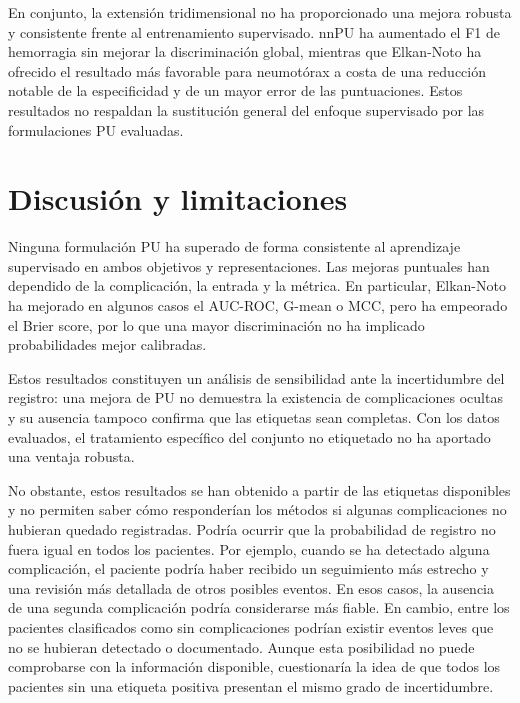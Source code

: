 En conjunto, la extensión tridimensional no ha proporcionado una mejora robusta y consistente frente al entrenamiento supervisado. nnPU ha aumentado el F1 de hemorragia sin mejorar la discriminación global, mientras que Elkan-Noto ha ofrecido el resultado más favorable para neumotórax a costa de una reducción notable de la especificidad y de un mayor error de las puntuaciones. Estos resultados no respaldan la sustitución general del enfoque supervisado por las formulaciones PU evaluadas.

\section{Discusión y limitaciones}

Ninguna formulación PU ha superado de forma consistente al aprendizaje supervisado en ambos objetivos y representaciones. Las mejoras puntuales han dependido de la complicación, la entrada y la métrica. En particular, Elkan-Noto ha mejorado en algunos casos el AUC-ROC, G-mean o MCC, pero ha empeorado el Brier score, por lo que una mayor discriminación no ha implicado probabilidades mejor calibradas.

Estos resultados constituyen un análisis de sensibilidad ante la incertidumbre del registro: una mejora de PU no demuestra la existencia de complicaciones ocultas y su ausencia tampoco confirma que las etiquetas sean completas. Con los datos evaluados, el tratamiento específico del conjunto no etiquetado no ha aportado una ventaja robusta.

No obstante, estos resultados se han obtenido a partir de las etiquetas disponibles y no permiten saber cómo responderían los métodos si algunas complicaciones no hubieran quedado registradas. Podría ocurrir que la probabilidad de registro no fuera igual en todos los pacientes. Por ejemplo, cuando se ha detectado alguna complicación, el paciente podría haber recibido un seguimiento más estrecho y una revisión más detallada de otros posibles eventos. En esos casos, la ausencia de una segunda complicación podría considerarse más fiable. En cambio, entre los pacientes clasificados como sin complicaciones podrían existir eventos leves que no se hubieran detectado o documentado. Aunque esta posibilidad no puede comprobarse con la información disponible, cuestionaría la idea de que todos los pacientes sin una etiqueta positiva presentan el mismo grado de incertidumbre.

